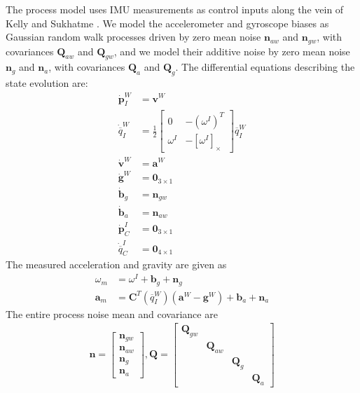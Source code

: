 \documentclass[letterpaper]{article}
\newcommand{\bb}[1]{\mathbf{#1}}
\begin{document}
The process model uses IMU measurements as control inputs along the
vein of Kelly and Sukhatme \cite{2011:kelly:article}. We model the accelerometer and
gyroscope biases as Gaussian random walk processes driven by zero mean
noise $\bb{n}_{aw}$ and $\bb{n}_{gw}$, with covariances $\bb{Q}_{aw}$
and $\bb{Q}_{gw}$, and we model their additive noise by zero mean
noise $\bb{n}_g$ and $\bb{n}_a$, with covariances $\bb{Q}_a$ and
$\bb{Q}_g$. The differential equations describing the state evolution
are:
\begin{align}
\dot{\bb{p}}_I^W &=\bb{v}^W \\ 
\dot{\overline{q}}_I^W&=\frac{1}{2}\begin{bmatrix}0 & -(\omega^I)^T \\ \omega^I & -[ \omega^I ]_{\times} \end{bmatrix} \overline{q}_I^W \nonumber\\
\dot{\bb{v}}^W &=\bb{a}^W  \nonumber\\
\dot{\bb{g}}^W &=\bb{0}_{3 \times 1}  \nonumber\\
\dot{\bb{b}}_g&=\bb{n}_{gw}  \nonumber\\
\dot{\bb{b}}_a&=\bb{n}_{aw}  \nonumber\\
\dot{\bb{p}}_C^I&=\bb{0}_{3 \times 1} \nonumber\\
\dot{\overline{q}}_C^I&=\bb{0}_{4 \times 1} \nonumber
\end{align}
The measured acceleration and gravity are given as
\begin{align}
\omega_m&=\omega^I+\bb{b}_g+\bb{n}_g  \\
\bb{a}_m&=\bb{C}^T(\overline{q}_I^W)(\bb{a}^W-\bb{g}^W)+\bb{b}_a+\bb{n}_a \nonumber
\end{align}
The entire process noise mean and covariance are
\begin{align}
\bb{n}=\begin{bmatrix} \bb{n}_{gw} \\ \bb{n}_{aw} \\ \bb{n}_g\\ \bb{n}_a \end{bmatrix}, \bb{Q}=\begin{bmatrix} \bb{Q}_{gw} & & & \\ & \bb{Q}_{aw} & & \\ & & \bb{Q}_g & \\ & & & \bb{Q}_a \end{bmatrix}
\end{align}
\end{document}
